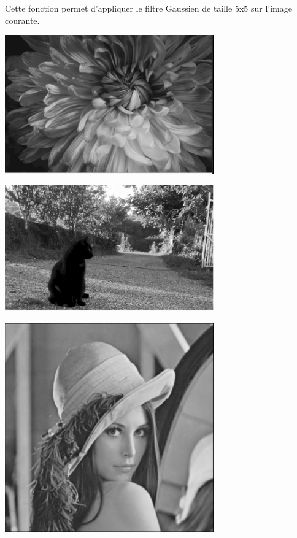 \documentclass{article}
\begin{document}
Cette fonction permet d'appliquer le filtre Gaussien de taille 5x5 sur l'image courante.
\begin{center} 
    \includegraphics[width=9cm]{../Image_fonctions/Multicolor/Gaussien.PNG}
\end{center}
\begin{center} 
    \includegraphics[width=9cm]{../Image_fonctions/Cat/Gaussien.PNG}
\end{center}
\begin{center} 
    \includegraphics[width=9cm]{../Image_fonctions/Lenna/Gaussien.PNG}
\end{center}
\end{document}
